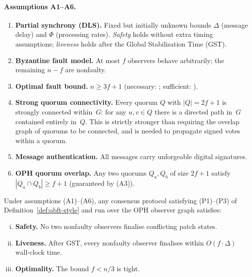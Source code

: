 \paragraph{Assumptions A1--A6.}
\begin{enumerate}[(A1)]
  \item \textbf{Partial synchrony (DLS).}
        Fixed but initially unknown bounds $\Delta$ (message delay) and
        $\Phi$ (processing rates).
        \emph{Safety} holds without extra timing assumptions;
        \emph{liveness} holds after the Global Stabilisation Time (\textrm{GST}).
  \item \textbf{Byzantine fault model.}
        At most $f$ observers behave arbitrarily; the remaining $n-f$ are nonfaulty.
  \item \textbf{Optimal fault bound.}
        $n \geq 3f+1$ (necessary: \cite{Lamport1982}; sufficient: \cite{Lamport1982}).
  \item \textbf{Strong quorum connectivity.}
        Every quorum $Q$ with $|Q|=2f+1$ is strongly connected within~$G$:
        for any $u,v\in Q$ there is a directed path in~$G$ contained
        entirely in~$Q$.
        This is strictly stronger than requiring the overlap graph of
        quorums to be connected, and is needed to propagate signed votes
        within a quorum.
  \item \textbf{Message authentication.}
        All messages carry unforgeable digital signatures.
  \item \textbf{OPH quorum overlap.}
        Any two quorums $Q_a, Q_b$ of size $2f+1$ satisfy
        $|Q_a\cap Q_b|\geq f+1$ (guaranteed by (A3)).
\end{enumerate}

\begin{theorem}
\label{thm:qbft-safety}
Under assumptions (A1)--(A6), any consensus protocol satisfying
(P1)--(P3) of Definition~\ref{def:qbft-style} and run over the
\textrm{OPH} observer graph satisfies:
\begin{enumerate}[(i)]
  \item \textbf{Safety.} No two nonfaulty observers finalise conflicting
        patch states.
  \item \textbf{Liveness.} After \textrm{GST}, every nonfaulty observer
        finalises within $O(f\cdot\Delta)$ wall-clock time.
  \item \textbf{Optimality.} The bound $f<n/3$ is tight.
\end{enumerate}
\end{theorem}

